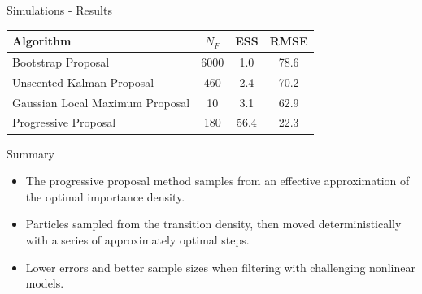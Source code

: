 \documentclass{beamer}
\begin{document}
\begin{frame}{Simulations - Results}
\begin{table}
\centering
\begin{tabular}{l||c|c|c}
Algorithm                                & $N_F$ & ESS  & RMSE \\
\hline
Bootstrap Proposal                       &  6000 &  1.0 & 78.6 \\
Unscented Kalman Proposal                &   460 &  2.4 & 70.2 \\
Gaussian Local Maximum Proposal          &    10 &  3.1 & 62.9 \\
Progressive Proposal                     &   180 & 56.4 & 22.3 \\
\end{tabular}
\end{table}
\end{frame}

\begin{frame}{Summary}
\begin{itemize}
 \item The progressive proposal method samples from an effective approximation of the optimal importance density.
 \item Particles sampled from the transition density, then moved deterministically with a series of approximately optimal steps.
 \item Lower errors and better sample sizes when filtering with challenging nonlinear models.
\end{itemize}
\end{frame}

\begin{frame}

\end{frame}


\end{document}
